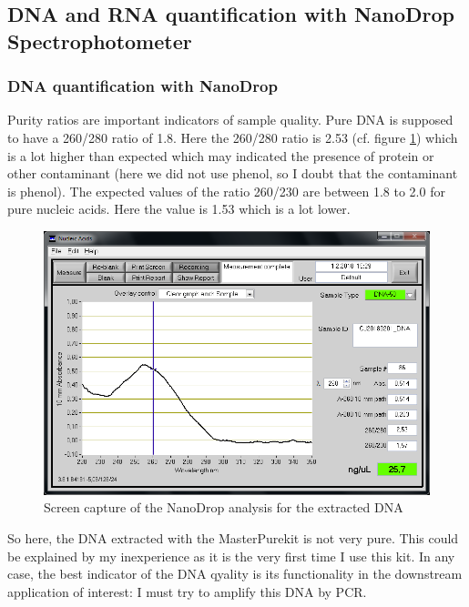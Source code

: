 \subsection{DNA and RNA quantification with NanoDrop Spectrophotometer}
\label{task:20180201_cj5}

\subsubsection{DNA quantification with NanoDrop}

Purity ratios are important indicators of sample quality. Pure DNA is supposed to have a 260/280 ratio of 1.8. Here the 260/280 ratio is 2.53 (cf. figure \ref{fig:CJ20180201_DNA}) which is a lot higher than expected which may indicated the presence of protein or other contaminant (here we did not use phenol, so I doubt that the contaminant is phenol). The expected values of the ratio 260/230 are between 1.8 to 2.0 for pure nucleic acids. Here the value is 1.53 which is a lot lower.

\begin{figure}[H] %
    \centering
    \caption{Screen capture of the NanoDrop analysis for the extracted DNA}
    \label{fig:CJ20180201_DNA}
    \includegraphics[width=\textwidth]{graphics/screenshots/CJ20180201_DNA.png}
\end{figure}

So here, the DNA extracted with the MasterPure\texttrademark kit is not very pure. This could be explained by my inexperience as it is the very first time I use this kit.  In any case, the best indicator of the DNA qyality is its functionality in the downstream application of interest: I must try to amplify this DNA by PCR.

